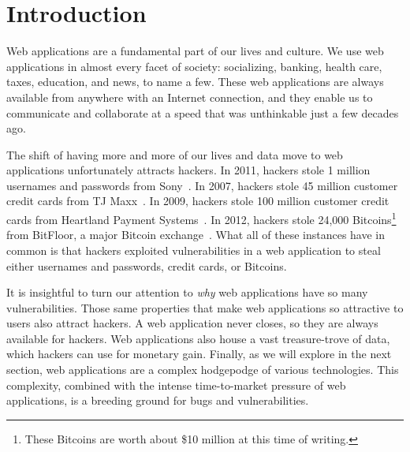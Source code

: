 \def\currentprefix{intro}



%
%

\chapter{Introduction}

Web applications are a fundamental part of our lives and culture. We
use web applications in almost every facet of society: socializing,
banking, health care, taxes, education, and news, to name a few. These
web applications are always available from anywhere with an Internet
connection, and they enable us to communicate and collaborate at a
speed that was unthinkable just a few decades ago.

The shift of having more and more of our lives and data move to web
applications unfortunately attracts hackers. In 2011, hackers stole 1
million usernames and passwords from Sony~\cite{bilton11:sony}. In
2007, hackers stole 45 million customer credit cards from TJ
Maxx~\cite{jewell07:tjmaxx}. In 2009, hackers stole 100 million
customer credit cards from Heartland Payment
Systems~\cite{acohido09:heartland}. In 2012, hackers stole 24,000
Bitcoins\footnote{These Bitcoins are worth about \$10 million at this
  time of writing.} from BitFloor, a major Bitcoin
exchange~\cite{kirk12:bitfloor}. What all of these instances have in
common is that hackers exploited vulnerabilities in a web application
to steal either usernames and passwords, credit cards, or Bitcoins.

It is insightful to turn our attention to \emph{why} web applications
have so many vulnerabilities. Those same properties that make web
applications so attractive to users also attract hackers. A web
application never closes, so they are always available for hackers.
Web applications also house a vast treasure-trove of data, which
hackers can use for monetary gain. Finally, as we will explore in the
next section, web applications are a complex hodgepodge of various
technologies. This complexity, combined with the intense
time-to-market pressure of web applications, is a breeding ground for
bugs and vulnerabilities.

